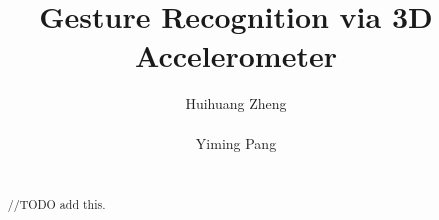 \documentclass{acm_proc_article-sp}
\begin{document}
\title{Gesture Recognition via 3D Accelerometer}


%
%
%
%
%

%
\author{
%
%
\alignauthor
Huihuang Zheng\\
       \\
\alignauthor
Yiming Pang\\
       \\
}


\maketitle
\begin{abstract}
//TODO add this.
\end{abstract}
\end{document}

